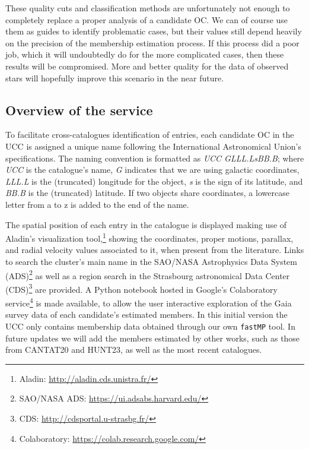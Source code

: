 \documentclass[fleqn,usenatbib]{mnras}
\begin{document}
These quality cuts and classification methods are unfortunately not
enough to completely replace a proper analysis of a candidate OC. We can of
course use them as guides to identify problematic cases, but their values still
depend heavily on the precision of the membership estimation process. If this
process did a poor job, which it will undoubtedly do for the more complicated
cases, then these results will be compromised.
More and better quality for the data of observed stars will hopefully improve
this scenario in the near future.






\subsection{Overview of the service}
\label{ssec:overview}

To facilitate cross-catalogues identification of entries, each candidate OC in
the UCC is assigned a unique name following the International Astronomical
Union's specifications. The naming convention is formatted as \emph{UCC
GLLL.LsBB.B}; where \emph{UCC} is the catalogue's name, \emph{G} indicates that
we are using galactic coordinates, \emph{LLL.L} is the (truncated) longitude
for the object, \emph{s} is the sign of its latitude, and \emph{BB.B} is the 
(truncated) latitude. If two objects share coordinates, a lowercase letter from
a to z is added to the end of the name.

%
The spatial position of each entry in the catalogue is displayed making use of
Aladin's visualization tool,\footnote{Aladin: 
\url{http://aladin.cds.unistra.fr/}}
showing the coordinates, proper motions, parallax, and radial velocity values
associated to it, when present from the literature.
Links to search the cluster's main name in the SAO/NASA Astrophysics Data System
(ADS)\footnote{SAO/NASA ADS: \url{https://ui.adsabs.harvard.edu/}} as well as
a region search in the Strasbourg astronomical Data Center
(CDS)\footnote{CDS: \url{http://cdsportal.u-strasbg.fr/}} are provided. A Python
notebook hosted in Google's Colaboratory
service\footnote{Colaboratory: \url{https://colab.research.google.com/}} is made
available, to allow the user interactive exploration of the Gaia survey data of
each candidate's estimated members. In this initial version the UCC only
contains membership data obtained through our own \texttt{fastMP} tool. In
future updates we will add the members estimated by other works, such as those
from CANTAT20 and HUNT23, as well as the most recent catalogues.
\end{document}

